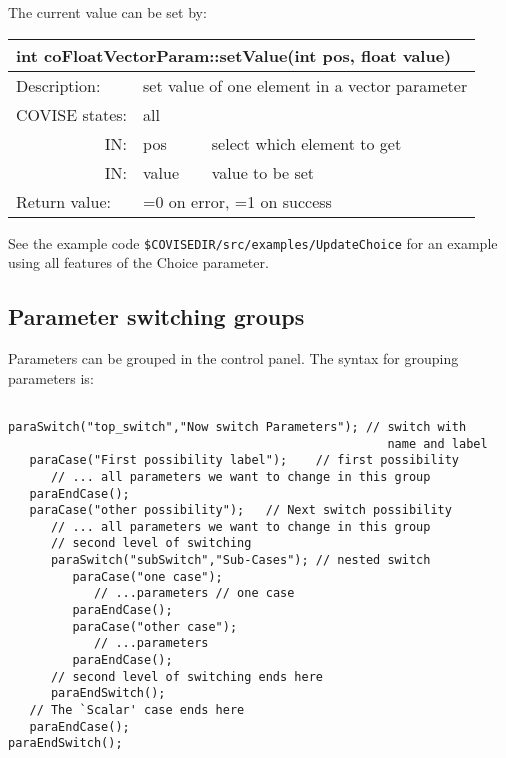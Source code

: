 
The current value can be set by:


\begin{longtable}{|p{4cm}|p{2.5cm}|p{7cm}|}
\hline
\multicolumn{3}{|p{13.5cm}|}{\bf int coFloatVectorParam::setValue(int pos, float value)} \\
\hline
{Description:}   
               & \multicolumn{2}{|p{9.5cm}|}{set value of one element in a vector parameter} \\
\hline
{COVISE states:} & \multicolumn{2}{|p{9.5cm}|}{all} \\
\hline
\multicolumn{1}{|r|}{IN:} & {pos} 
                             & {select which element to get}\\
\hline
\multicolumn{1}{|r|}{IN:} & {value} 
                             & {value to be set}\\
\hline
{Return value:}  
                        & \multicolumn{2}{|p{9.5cm}|}{=0 on error, =1 on success} \endhead
\hline
\end{longtable}

See the example code {\tt \$COVISEDIR/src/examples/UpdateChoice} for an example using 
all features of the Choice parameter.


\subsection{Parameter switching groups}


Parameters can be grouped in the control panel. The syntax for grouping parameters is:

\begin{verbatim}

paraSwitch("top_switch","Now switch Parameters"); // switch with 
                                                     name and label
   paraCase("First possibility label");    // first possibility 
      // ... all parameters we want to change in this group
   paraEndCase();
   paraCase("other possibility");   // Next switch possibility
      // ... all parameters we want to change in this group
      // second level of switching 
      paraSwitch("subSwitch","Sub-Cases"); // nested switch 
         paraCase("one case");
            // ...parameters // one case
         paraEndCase();
         paraCase("other case");
            // ...parameters
         paraEndCase();
      // second level of switching ends here
      paraEndSwitch();
   // The `Scalar' case ends here
   paraEndCase();
paraEndSwitch();

\end{verbatim}
 

